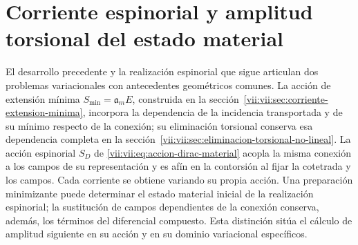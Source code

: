 
\section{Corriente espinorial y amplitud torsional del estado material}
\label{vii:vii:sec:corriente-espinorial-densidad}

El desarrollo precedente y la realización espinorial que sigue articulan
dos problemas variacionales con antecedentes geométricos comunes. La
acción de extensión mínima \(S_{\min}=\mathfrak a_m E\), construida en
la sección~\ref{vii:vii:sec:corriente-extension-minima}, incorpora la
dependencia de la incidencia transportada y de su mínimo respecto de la
conexión; su eliminación torsional conserva esa dependencia completa en
la sección~\ref{vii:vii:sec:eliminacion-torsional-no-lineal}. La acción
espinorial \(S_D\) de \eqref{vii:vii:eq:accion-dirac-material} acopla la
misma conexión a los campos de su representación y es afín en la
contorsión al fijar la cotetrada y los campos. Cada corriente se obtiene
variando su propia acción. Una preparación minimizante puede determinar
el estado material inicial de la realización espinorial; la sustitución
de campos dependientes de la conexión conserva, además, los términos
del diferencial compuesto. Esta distinción sitúa el cálculo de amplitud
siguiente en su acción y en su dominio variacional específicos.

